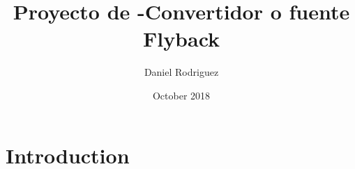 \documentclass{article}
\title{Proyecto de -Convertidor o fuente Flyback}
\author{Daniel Rodriguez}
\date{October 2018}
\begin{document}
\maketitle

\section{Introduction}
\end{document}
